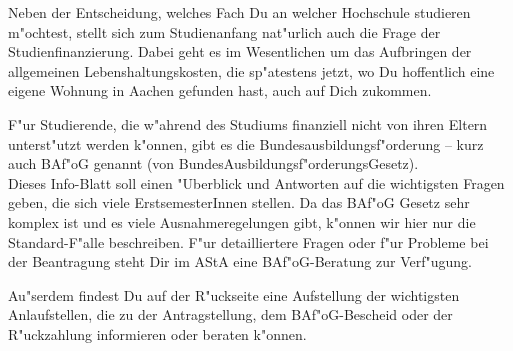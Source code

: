 \begin{artikel}{}
\vspace{-16pt}
Neben der Entscheidung, welches Fach Du an welcher Hochschule studieren m"ochtest, stellt sich zum Studienanfang nat"urlich auch die Frage der Studienfinanzierung. Dabei geht es im Wesentlichen um das Aufbringen der allgemeinen Lebenshaltungskosten, die sp"atestens jetzt, wo Du hoffentlich eine eigene Wohnung in Aachen gefunden hast, auch auf Dich zukommen.

F"ur Studierende, die w"ahrend des Studiums finanziell nicht von ihren Eltern unterst"utzt werden k"onnen, gibt es die Bundesausbildungsf"orderung -- kurz auch BAf"oG genannt (von BundesAusbildungsf"orderungsGesetz).\\

Dieses Info-Blatt soll einen "Uberblick und Antworten auf die wichtigsten Fragen geben, die sich viele ErstsemesterInnen stellen. Da das BAf"oG Gesetz sehr komplex ist und es viele Ausnahmeregelungen gibt, k"onnen wir hier nur die Standard-F"alle beschreiben. F"ur detailliertere Fragen oder f"ur Probleme bei der Beantragung steht Dir im AStA eine BAf"oG-Beratung zur Verf"ugung.

Au"serdem findest Du auf der R"uckseite eine Aufstellung der wichtigsten Anlaufstellen, die zu der Antragstellung, dem BAf"oG-Bescheid oder der R"uckzahlung informieren oder beraten k"onnen.
\end{artikel}
